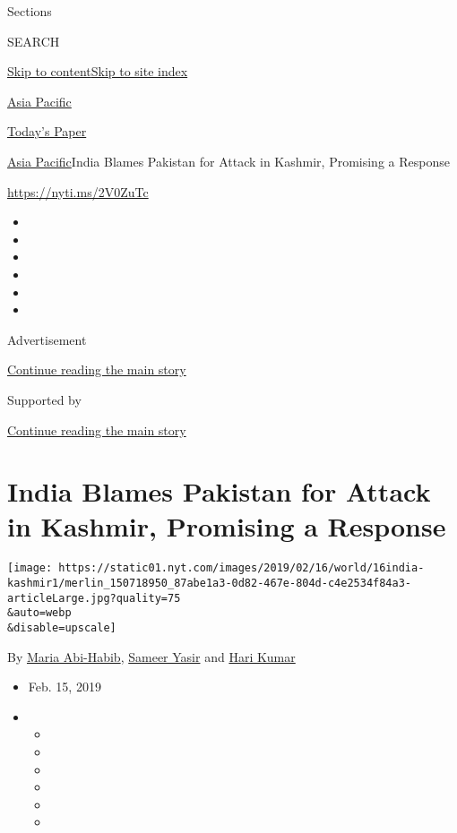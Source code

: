 Sections

SEARCH

\protect\hyperlink{site-content}{Skip to
content}\protect\hyperlink{site-index}{Skip to site index}

\href{https://www.nytimes.com/section/world/asia}{Asia Pacific}

\href{https://myaccount.nytimes.com/auth/login?response_type=cookie\&client_id=vi}{}

\href{https://www.nytimes.com/section/todayspaper}{Today's Paper}

\href{/section/world/asia}{Asia Pacific}\textbar{}India Blames Pakistan
for Attack in Kashmir, Promising a Response

\url{https://nyti.ms/2V0ZuTc}

\begin{itemize}
\item
\item
\item
\item
\item
\item
\end{itemize}

Advertisement

\protect\hyperlink{after-top}{Continue reading the main story}

Supported by

\protect\hyperlink{after-sponsor}{Continue reading the main story}

\hypertarget{india-blames-pakistan-for-attack-in-kashmir-promising-a-response}{%
\section{India Blames Pakistan for Attack in Kashmir, Promising a
Response}\label{india-blames-pakistan-for-attack-in-kashmir-promising-a-response}}

\texttt{[image: https://static01.nyt.com/images/2019/02/16/world/16india-kashmir1/merlin\_150718950\_87abe1a3-0d82-467e-804d-c4e2534f84a3-articleLarge.jpg?quality=75\\\&auto=webp\\\&disable=upscale]}

By \href{https://www.nytimes.com/by/maria-abi-habib}{Maria Abi-Habib},
\href{https://www.nytimes.com/by/sameer-yasir}{Sameer Yasir} and
\href{https://www.nytimes.com/by/hari-kumar}{Hari Kumar}

\begin{itemize}
\item
  Feb. 15, 2019
\item
  \begin{itemize}
  \item
  \item
  \item
  \item
  \item
  \item
  \end{itemize}
\end{itemize}

